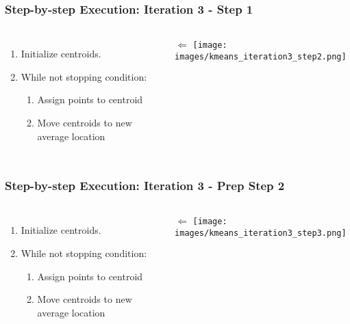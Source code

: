\documentclass{beamer}
\begin{document}
\begin{frame}
  \frametitle{Step-by-step Execution: Iteration 3 - Step 1}
  \begin{columns}
      \begin{enumerate}
        \item Initialize centroids. \vspace{2mm}
        \item While not stopping condition: \vspace{2mm}
        \begin{enumerate}
          \item Assign points to centroid \vspace{2mm}
          \item Move centroids to new average location
        \end{enumerate}
      \end{enumerate}
      \vspace{11mm} $\Longleftarrow$
      \texttt{[image: images/kmeans\_iteration3\_step2.png]}
  \end{columns}
\end{frame}

\begin{frame}
  \frametitle{Step-by-step Execution: Iteration 3 - Prep Step 2 }
  \begin{columns}
      \begin{enumerate}
        \item Initialize centroids. \vspace{2mm}
        \item While not stopping condition: \vspace{2mm}
        \begin{enumerate}
          \item Assign points to centroid \vspace{2mm}
          \item Move centroids to new average location
        \end{enumerate}
      \end{enumerate}
      \vspace{22mm} $\Longleftarrow$
      \texttt{[image: images/kmeans\_iteration3\_step3.png]}
  \end{columns}
\end{frame}
\end{document}
